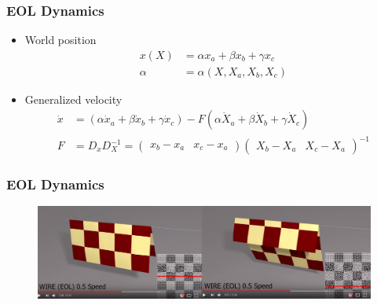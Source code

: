 \documentclass[serif,mathserif, 12pt]{beamer}
\begin{document}
\begin{frame}
  \frametitle{EOL Dynamics}
  \begin{itemize}
  \item World position
    \[
    \begin{split}
    x(X) &= \alpha x_a+\beta x_b + \gamma x_c \\
    \alpha &= \alpha(X, X_a, X_b, X_c)
    \end{split}
    \]
  \item Generalized velocity
    \[
    \begin{split}
      \dot x &= (\alpha \dot x_a+\beta \dot x_b+\gamma \dot x_c)-F(\alpha \dot X_a+\beta \dot X_b+\gamma \dot X_c)\\
      F &= D_xD_X^{-1} = \begin{pmatrix}
        x_b-x_a & x_c-x_a
      \end{pmatrix}
      \begin{pmatrix}
        X_b-X_a & X_c-X_a
      \end{pmatrix}^{-1}
    \end{split}
    \]
  \end{itemize}
\end{frame}

\begin{frame}
  \frametitle{EOL Dynamics}
  \begin{figure}
    \centering
    \includegraphics[width=\textwidth]{img/wire_mat_space}
  \end{figure}
\end{frame}
\end{document}
